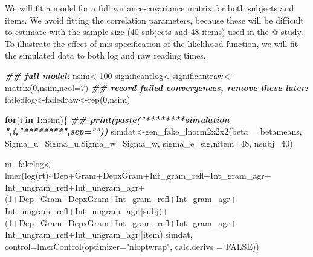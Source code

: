 \documentclass[
  12pt,
]{krantz}
\newenvironment{Shaded}{\begin{snugshade}}{\end{snugshade}}
\newcommand{\AttributeTok}[1]{\textcolor[rgb]{0.77,0.63,0.00}{#1}}
\newcommand{\ConstantTok}[1]{\textcolor[rgb]{0.00,0.00,0.00}{#1}}
\newcommand{\ControlFlowTok}[1]{\textcolor[rgb]{0.13,0.29,0.53}{\textbf{#1}}}
\newcommand{\DecValTok}[1]{\textcolor[rgb]{0.00,0.00,0.81}{#1}}
\newcommand{\DocumentationTok}[1]{\textcolor[rgb]{0.56,0.35,0.01}{\textbf{\textit{#1}}}}
\newcommand{\FunctionTok}[1]{\textcolor[rgb]{0.00,0.00,0.00}{#1}}
\newcommand{\NormalTok}[1]{#1}
\newcommand{\OtherTok}[1]{\textcolor[rgb]{0.56,0.35,0.01}{#1}}
\newcommand{\SpecialCharTok}[1]{\textcolor[rgb]{0.00,0.00,0.00}{#1}}
\newcommand{\StringTok}[1]{\textcolor[rgb]{0.31,0.60,0.02}{#1}}
\theoremstyle{definition}
\theoremstyle{definition}
\theoremstyle{definition}
\theoremstyle{definition}
\theoremstyle{remark}
\begin{document}
We will fit a model for a full variance-covariance matrix for both subjects and items. We avoid fitting the correlation parameters, because these will be difficult to estimate with the sample size (40 subjects and 48 items) used in the @\citet{Dillon-EtAl-2013} study. To illustrate the effect of mis-specification of the likelihood function, we will fit the simulated data to both log and raw reading times.

\begin{Shaded}
\begin{Highlighting}[]
\DocumentationTok{\#\# full model:}
\NormalTok{nsim}\OtherTok{\textless{}{-}}\DecValTok{100}
\NormalTok{significantlog}\OtherTok{\textless{}{-}}\NormalTok{significantraw}\OtherTok{\textless{}{-}}\FunctionTok{matrix}\NormalTok{(}\DecValTok{0}\NormalTok{,nsim,}\AttributeTok{ncol=}\DecValTok{7}\NormalTok{)}
\DocumentationTok{\#\# record failed convergences, remove these later:}
\NormalTok{failedlog}\OtherTok{\textless{}{-}}\NormalTok{failedraw}\OtherTok{\textless{}{-}}\FunctionTok{rep}\NormalTok{(}\DecValTok{0}\NormalTok{,nsim)}

\ControlFlowTok{for}\NormalTok{(i }\ControlFlowTok{in} \DecValTok{1}\SpecialCharTok{:}\NormalTok{nsim)\{}
\DocumentationTok{\#\#  print(paste("********simulation ",i,"********",sep=""))}
\NormalTok{  simdat}\OtherTok{\textless{}{-}}\FunctionTok{gen\_fake\_lnorm2x2x2}\NormalTok{(}\AttributeTok{beta =}\NormalTok{ betameans,}
                               \AttributeTok{Sigma\_u=}\NormalTok{Sigma\_u,}\AttributeTok{Sigma\_w=}\NormalTok{Sigma\_w,}
                               \AttributeTok{sigma\_e=}\NormalTok{sig,}\AttributeTok{nitem=}\DecValTok{48}\NormalTok{,}
                               \AttributeTok{nsubj=}\DecValTok{40}\NormalTok{)}

\NormalTok{  m\_fakelog}\OtherTok{\textless{}{-}}\FunctionTok{lmer}\NormalTok{(}\FunctionTok{log}\NormalTok{(rt)}\SpecialCharTok{\textasciitilde{}}\NormalTok{Dep}\SpecialCharTok{+}\NormalTok{Gram}\SpecialCharTok{+}\NormalTok{DepxGram}\SpecialCharTok{+}\NormalTok{Int\_gram\_refl}\SpecialCharTok{+}\NormalTok{Int\_gram\_agr}\SpecialCharTok{+}
\NormalTok{                 Int\_ungram\_refl}\SpecialCharTok{+}\NormalTok{Int\_ungram\_agr}\SpecialCharTok{+}
\NormalTok{                 (}\DecValTok{1}\SpecialCharTok{+}\NormalTok{Dep}\SpecialCharTok{+}\NormalTok{Gram}\SpecialCharTok{+}\NormalTok{DepxGram}\SpecialCharTok{+}\NormalTok{Int\_gram\_refl}\SpecialCharTok{+}\NormalTok{Int\_gram\_agr}\SpecialCharTok{+}
\NormalTok{                    Int\_ungram\_refl}\SpecialCharTok{+}\NormalTok{Int\_ungram\_agr}\SpecialCharTok{||}\NormalTok{subj)}\SpecialCharTok{+}
\NormalTok{                 (}\DecValTok{1}\SpecialCharTok{+}\NormalTok{Dep}\SpecialCharTok{+}\NormalTok{Gram}\SpecialCharTok{+}\NormalTok{DepxGram}\SpecialCharTok{+}\NormalTok{Int\_gram\_refl}\SpecialCharTok{+}\NormalTok{Int\_gram\_agr}\SpecialCharTok{+}
\NormalTok{                    Int\_ungram\_refl}\SpecialCharTok{+}\NormalTok{Int\_ungram\_agr}\SpecialCharTok{||}\NormalTok{item),simdat,}
               \AttributeTok{control=}\FunctionTok{lmerControl}\NormalTok{(}\AttributeTok{optimizer=}\StringTok{"nloptwrap"}\NormalTok{, }\AttributeTok{calc.derivs =} \ConstantTok{FALSE}\NormalTok{))}


\end{Highlighting}
\end{Shaded}
\end{document}
